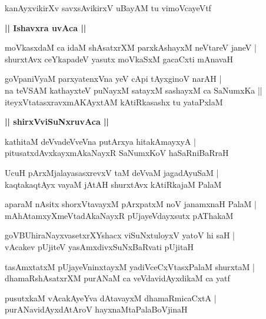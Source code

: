 \documentclass[twoside,12pt,openright]{book}
\newcounter{shloka}[chapter]
\def\uvaca#1{\centerline{{\large\textbf{#1}}}}
\begin{document}
\begin{shloka}%
kanAyxvikirXv savxsAvikirxV uBayAM tu vimoVcayeVtf 
\end{shloka}

\uvaca{|| Ishavxra uvAca ||}

\begin{shloka}%
moVkasxdaM ca idaM shAsatxrXM parxkAshayxM neVtareV janeV |\\
shurxtAvx ceYkapadeV yasutx moVkaSxM gacaCxti mAnavaH 
\end{shloka}

\begin{shloka}%
goVpaniVyaM parxyatenxVna yeV cApi tAyxginoV narAH |\\
na teVSAM kathayxteV puNayxM satayxM sashayxM ca SaNumxKa ||\\
iteyxVtatasxravxmAKAyxtAM kAtiRkasashx tu yataPxlaM
\end{shloka}

\uvaca{|| shirxVviSuNxruvAca ||}

\begin{shloka}%
kathitaM deVvadeVveVna putArxya hitakAmayxyA |\\
pitusatxdAvxkayxmAkaNayxR SaNumxKoV haSaRniBaRraH 
\end{shloka}

\begin{shloka}%
UcuH pArxMjalayasasxrevxV taM deVvaM jagadAyuSaM |\\
kaqtakaqtAyx vayaM jAtAH shurxtAvx kAtiRkajaM PalaM
\end{shloka}

\begin{shloka}%
aparaM nAsitx shorxVtavayxM pArxpatxM noV janamxnaH PalaM |\\
mAhAtamxyXmeVtadAkaNayxR pUjayeVdayxsutx pAThakaM 
\end{shloka}

\begin{shloka}%
goVBUhiraNayxvasetxrXYshacx viSuNxtuloyxV yatoV hi saH |\\
vAcakev pUjiteV yasAmxdivxSuNxBaRvati pUjitaH 
\end{shloka}

\begin{shloka}%
tasAmxtatxM pUjayeVninxtayxM yadiVceCxVtasxPalaM shurxtaM |\\
dhamaRshAsatxrXM purANaM ca veVdavidAyxdikaM ca yatf
\end{shloka}

\begin{shloka}%
pusutxkaM vAcakAyeYva dAtavayxM dhamaRmicaCxtA |\\
purANavidAyxdAtAroV hayxnaMtaPalaBoVjinaH 
\end{shloka}
\end{document}
